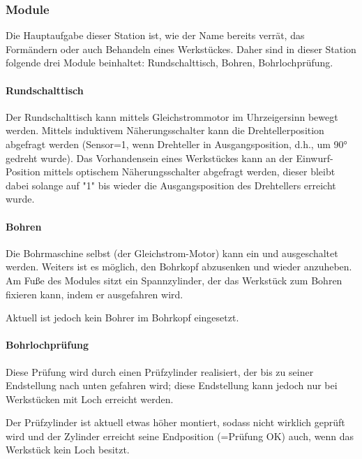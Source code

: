 \documentclass[11pt,a4paper,ngerman]{article}
\begin{document}
\subsubsection{Module}
Die Hauptaufgabe dieser Station ist, wie der Name bereits verrät, das Formändern oder auch Behandeln eines Werkstückes. Daher sind in dieser Station folgende drei Module beinhaltet: Rundschalttisch, Bohren, Bohrlochprüfung.

\paragraph{Rundschalttisch}
Der Rundschalttisch kann mittels Gleichstrommotor im Uhrzeigersinn bewegt werden. Mittels induktivem Näherungsschalter kann die Drehtellerposition abgefragt werden (Sensor=1, wenn Drehteller in Ausgangsposition, d.h., um 90° gedreht wurde). Das Vorhandensein eines Werkstückes kann an der Einwurf-Position mittels optischem Näherungsschalter abgefragt werden, dieser bleibt dabei solange auf "1" bis wieder die Ausgangsposition des Drehtellers erreicht wurde.

\paragraph{Bohren}
Die Bohrmaschine selbst (der Gleichstrom-Motor) kann ein und ausgeschaltet werden. Weiters ist es möglich, den Bohrkopf abzusenken und wieder anzuheben. Am Fuße des Modules sitzt ein Spannzylinder, der das Werkstück zum Bohren fixieren kann, indem er ausgefahren wird.

Aktuell ist jedoch kein Bohrer im Bohrkopf eingesetzt.

\paragraph{Bohrlochprüfung}
Diese Prüfung wird durch einen Prüfzylinder realisiert, der bis zu seiner Endstellung nach unten gefahren wird; diese Endstellung kann jedoch nur bei Werkstücken mit Loch erreicht werden.

Der Prüfzylinder ist aktuell etwas höher montiert, sodass nicht wirklich geprüft wird und der Zylinder erreicht seine Endposition (=Prüfung OK) auch, wenn das Werkstück kein Loch besitzt.
\end{document}
